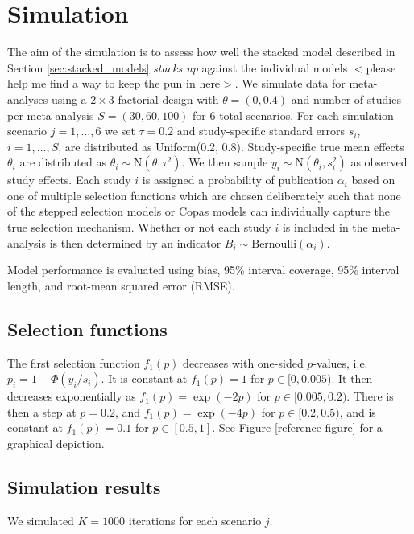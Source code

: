 \documentclass[12pt]{article}   	%
\numberwithin{equation}{section}
\begin{document}
\section{Simulation} \label{sec:simulation}

The aim of the simulation is to assess how well the stacked model described in Section \ref{sec:stacked_models} \textit{stacks up} against the individual models $<$please help me find a way to keep the pun in here$>$. We simulate data for meta-analyses using a $2\times3$ factorial design with $\theta = (0, 0.4)$ and number of studies per meta analysis $S = (30, 60, 100)$ for 6 total scenarios. For each simulation scenario $j = 1, \dots, 6$ we set $\tau = 0.2$ and study-specific standard errors $s_i$, $i = 1, \dots, S$, are distributed as Uniform(0.2, 0.8). Study-specific true mean effects $\theta_i$ are distributed as $\theta_i \sim \text{N}(\theta, \tau^2)$. We then sample $y_i \sim \text{N}(\theta_i, s_i^2)$ as observed study effects. Each study $i$ is assigned a probability of publication $\alpha_i$ based on one of multiple selection functions which are chosen deliberately such that none of the stepped selection models or Copas models can individually capture the true selection mechanism. Whether or not each study $i$ is included in the meta-analysis is then determined by an indicator $B_i \sim \text{Bernoulli}(\alpha_i)$. 

Model performance is evaluated using bias, 95\% interval coverage, 95\% interval length, and root-mean squared error (RMSE). 

\subsection{Selection functions}

The first selection function $f_1(p)$ decreases with one-sided $p$-values, i.e. $p_i = 1 - \Phi(y_i / s_i)$. It is constant at $f_1(p) = 1$ for $p \in [0, 0.005)$. It then decreases exponentially as $f_1(p) = \exp(-2p)$ for $p \in [0.005, 0.2)$. There is then a step at $p=0.2$, and $f_1(p) = \exp(-4p)$ for $p \in [0.2, 0.5)$, and is constant at $f_1(p) = 0.1$ for $p \in [0.5, 1]$. See Figure [reference figure] for a graphical depiction.

\subsection{Simulation results}

We simulated $K=1000$ iterations for each scenario $j$.
\end{document}
